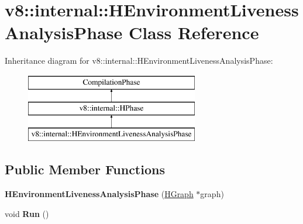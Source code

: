 \hypertarget{classv8_1_1internal_1_1_h_environment_liveness_analysis_phase}{}\section{v8\+:\+:internal\+:\+:H\+Environment\+Liveness\+Analysis\+Phase Class Reference}
\label{classv8_1_1internal_1_1_h_environment_liveness_analysis_phase}
Inheritance diagram for v8\+:\+:internal\+:\+:H\+Environment\+Liveness\+Analysis\+Phase\+:\begin{figure}[H]
\begin{center}
\leavevmode
\includegraphics[height=3.000000cm]{classv8_1_1internal_1_1_h_environment_liveness_analysis_phase}
\end{center}
\end{figure}
\subsection*{Public Member Functions}
\begin{DoxyCompactItemize}
\item 
{\bfseries H\+Environment\+Liveness\+Analysis\+Phase} (\hyperlink{classv8_1_1internal_1_1_h_graph}{H\+Graph} $\ast$graph)\hypertarget{classv8_1_1internal_1_1_h_environment_liveness_analysis_phase_a70879649cd192269c10bc499852a4778}{}\label{classv8_1_1internal_1_1_h_environment_liveness_analysis_phase_a70879649cd192269c10bc499852a4778}

\item 
void {\bfseries Run} ()\hypertarget{classv8_1_1internal_1_1_h_environment_liveness_analysis_phase_a6891181f8f2f51ca31f5936578939c49}{}\label{classv8_1_1internal_1_1_h_environment_liveness_analysis_phase_a6891181f8f2f51ca31f5936578939c49}

\end{DoxyCompactItemize}
